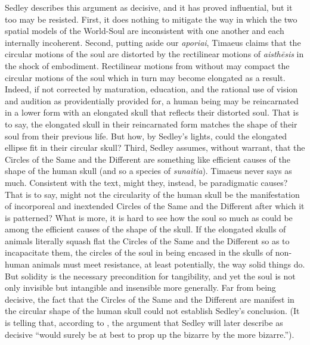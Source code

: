 Sedley describes this argument as decisive, and it has proved influential, but it too may be resisted. First, it does nothing to mitigate the way in which the two spatial models of the World-Soul are inconsistent with one another and each internally incoherent. Second, putting aside our \emph{aporiai}, Timaeus claims that the circular motions of the soul are distorted by the rectilinear motions of \emph{aisthēsis} in the shock of embodiment. Rectilinear motions from without may compact the circular motions of the soul which in turn may become elongated as a result. Indeed, if not corrected by maturation, education, and the rational use of vision and audition as providentially provided for, a human being may be reincarnated in a lower form with an elongated skull that reflects their distorted soul. That is to say, the elongated skull in their reincarnated form matches the shape of their soul from their previous life. But how, by Sedley's lights, could the elongated ellipse fit in their circular skull? Third, Sedley assumes, without warrant, that the Circles of the Same and the Different are something like efficient causes of the shape of the human skull (and so a species of \emph{sunaitia}). Timaeus never says as much. Consistent with the text, might they, instead, be paradigmatic causes? That is to say, might not the circularity of the human skull be the manifestation of incorporeal and inextended Circles of the Same and the Different after which it is patterned? What is more, it is hard to see how the soul so much as could be among the efficient causes of the shape of the skull. If the elongated skulls of animals literally squash flat the Circles of the Same and the Different so as to incapacitate them, the circles of the soul in being encased in the skulls of non-human animals must meet resistance, at least potentially, the way solid things do. But solidity is the necessary precondition for tangibility, and yet the soul is not only invisible but intangible and insensible more generally. Far from being decisive, the fact that the Circles of the Same and the Different are manifest in the circular shape of the human skull could not establish Sedley's conclusion. (It is telling that, according to \citealt[72]{Lee:1976xs}, the argument that Sedley will later describe as decisive ``would surely be at best to prop up the bizarre by the more bizarre.'').


